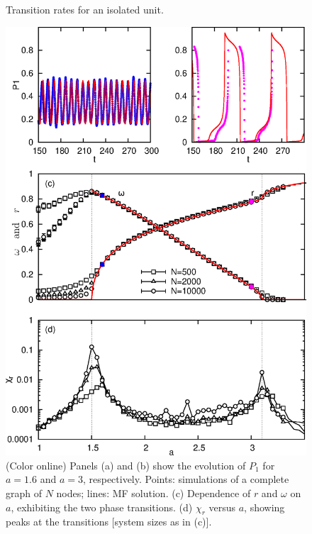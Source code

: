 \begin{figure}[!b]
\begin{center}
\caption{\label{fig:taxas}
    Transition rates for an isolated unit.
    }
\end{center}
\end{figure}

\begin{figure}
    \includegraphics[height=.75\textheight]{fig/figure2.eps}
\begin{center}
\caption{\label{complete_graph} (Color online) Panels (a) and (b) show the evolution of $P_1$ for $a=1.6$ and $a=3$, respectively.
Points: simulations of a complete graph of $N$ nodes; lines: MF solution. (c) Dependence of $r$ and $\omega$ on $a$, exhibiting the two
phase transitions. (d) $\chi_r$ versus $a$, showing peaks at the transitions [system sizes as in (c)].  }
\end{center}
\end{figure}

